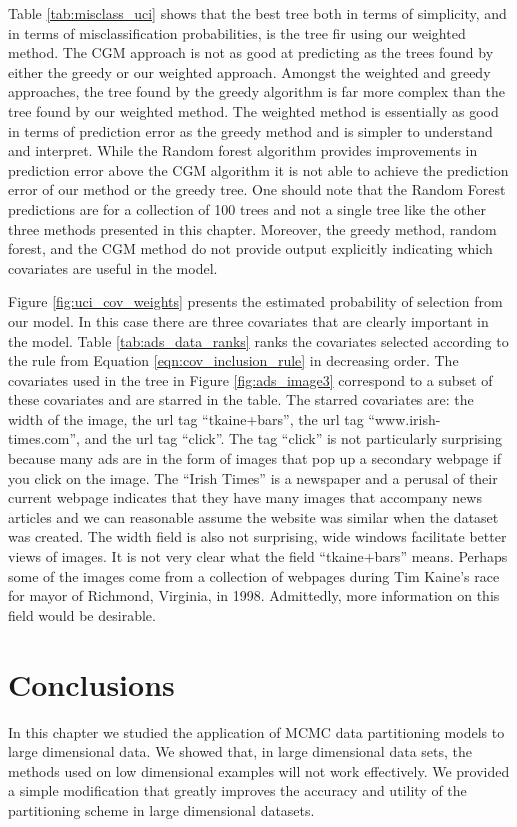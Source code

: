 Table \ref{tab:misclass_uci} shows that the best tree both in terms of simplicity, and in terms of misclassification probabilities, is the tree fir using our weighted method. The CGM approach is not as good at predicting as the trees found by either the greedy or our weighted approach. Amongst the weighted and greedy approaches, the tree found by the greedy algorithm is far more complex than the tree found by our weighted method. The weighted method is essentially as good in terms of prediction error as the greedy method and is simpler to understand and interpret. While the Random forest algorithm provides improvements in prediction error above the CGM algorithm it is not able to achieve the prediction error of our method or the greedy tree. One should note that the Random Forest predictions are for a collection of 100 trees and not a single tree like the other three methods presented in this chapter. Moreover, the greedy method, random forest, and the CGM method do not provide output explicitly indicating which covariates are useful in the model.

Figure \ref{fig:uci_cov_weights} presents the estimated  probability of selection from our model. In this case there are three covariates that are clearly important in the model. Table \ref{tab:ads_data_ranks} ranks the covariates selected according to the rule from Equation \ref{eqn:cov_inclusion_rule} in decreasing order. The covariates used in the tree in Figure \ref{fig:ads_image3} correspond to a subset of these covariates and are starred in the table. The starred covariates are: the width of the image, the url tag ``tkaine+bars'', the url tag ``www.irish-times.com'', and the url tag ``click''. The tag ``click'' is not particularly surprising because many ads are in the form of images that pop up a secondary webpage if you click on the image. The ``Irish Times'' is a newspaper and a perusal of their current webpage indicates that they have many images that accompany news articles and we can reasonable assume the website was similar when the dataset was created. The width field is also not surprising, wide windows facilitate better views of images. It is not very clear what the field ``tkaine+bars'' means. Perhaps some of the images come from a collection of webpages during Tim Kaine's race for mayor of Richmond, Virginia, in 1998. Admittedly, more information on this field would be desirable. 
 
\section{Conclusions}\label{sec:conc}
In this chapter we studied the application of MCMC data partitioning models to large dimensional data. We showed that, in large dimensional data sets, the methods used on low dimensional examples will not work effectively. We provided a simple modification that greatly improves the accuracy and utility of the partitioning scheme in large dimensional datasets. 

